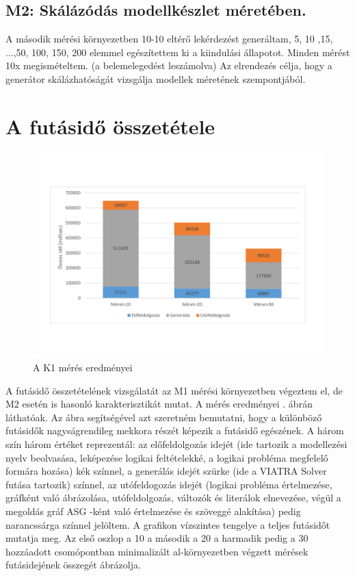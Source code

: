 \subsection{M2: Skálázódás modellkészlet méretében.} 
A második  mérési környezetben 10-10 eltérő lekérdezést generáltam, 5, 10 ,15, ...,50, 100, 150, 200 elemmel egészítettem ki a kiindulási állapotot. Minden mérést 10x megismételtem. (a belemelegedést leszámolva) Az elrendezés célja, hogy a generátor skálázhatóságát vizsgálja modellek méretének szempontjából.


\section{A futásidő összetétele}

\begin{figure}
	\centering
	\includegraphics[width=1\textwidth]{figures/aránygrafikontáblázathelyett}
	\caption{A K1 mérés eredményei}
	\label{fig:grafikon}
\end{figure}

A futásidő összetételének vizsgálatát az M1 mérési környezetben végeztem el, de M2 esetén is hasonló karakterisztikát mutat. A mérés eredményei  . ábrán láthatóak. Az ábra segítségével azt szeretném bemutatni, hogy a különböző futásidők nagyságrendileg mekkora részét képezik a futásidő egészének. A három szín három értéket reprezentál: az előfeldolgozás idejét (ide tartozik a modellezési nyelv beolvasása, leképezése logikai feltételekké, a logikai probléma megfelelő formára hozása) kék színnel, a generálás idejét szürke (ide a VIATRA Solver futása tartozik) színnel, az utófeldogozás idejét (logikai probléma értelmezése, gráfként való ábrázolása, utófeldolgozás, változók és literálok elnevezése, végül a megoldás gráf ASG -ként való értelmezése és szöveggé alakítása) pedig narancssárga színnel jelöltem. A grafikon vízszintes tengelye a teljes futásidőt mutatja meg. Az első oszlop a 10 a második a 20 a harmadik pedig a 30 hozzáadott csomópontban minimalizált al-környezetben végzett mérések futásidejének összegét ábrázolja. 

